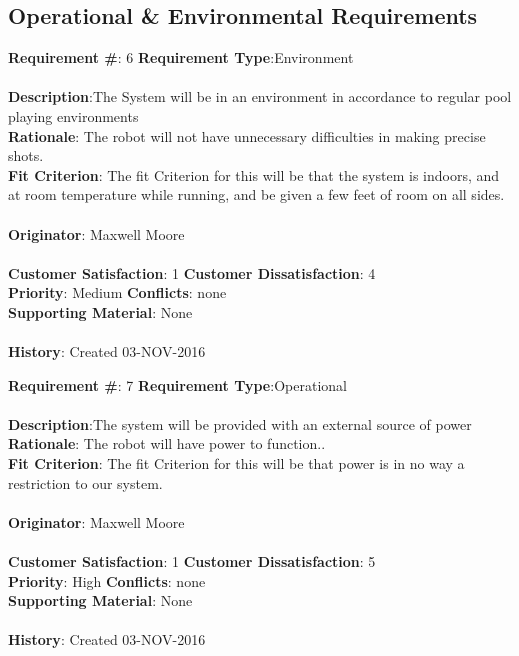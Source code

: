 \documentclass[titlepage]{article}
\begin{document}
 \subsection{Operational \& Environmental Requirements}


\begin{framed}
	\noindent\textbf{Requirement \#}: 6 \hfill \textbf{Requirement Type}:Environment \hfill\\\\
	\noindent\textbf{Description}:The System will be in an environment in accordance to regular pool playing environments\\
	\textbf{Rationale}: The robot will not have unnecessary difficulties in making precise shots.\\
	\textbf{Fit Criterion}: The fit Criterion for this will be that the system is indoors, and at room temperature while running, and be given a few feet of room on all sides.\\\\
	\textbf{Originator}: Maxwell Moore\\\\
	\noindent\textbf{Customer Satisfaction}: 1 \hfill 	\textbf{Customer Dissatisfaction}: 4 \hfill\\
	\textbf{Priority}: Medium \hfill \textbf{Conflicts}: none \hfill\\
	\textbf{Supporting Material}: None\\\\
	\noindent\textbf{History}: Created 03-NOV-2016
\end{framed}

\begin{framed}
	\noindent\textbf{Requirement \#}: 7 \hfill \textbf{Requirement Type}:Operational \hfill\\\\
	\noindent\textbf{Description}:The system will be provided with an external source of power\\
	\textbf{Rationale}: The robot will have power to function..\\
	\textbf{Fit Criterion}: The fit Criterion for this will be that power is in no way a restriction to our system.\\\\
	\textbf{Originator}: Maxwell Moore\\\\
	\noindent\textbf{Customer Satisfaction}: 1 \hfill 	\textbf{Customer Dissatisfaction}: 5 \hfill\\
	\textbf{Priority}: High \hfill \textbf{Conflicts}: none \hfill\\
	\textbf{Supporting Material}: None\\\\
	\noindent\textbf{History}: Created 03-NOV-2016
\end{framed}
 
\end{document}
